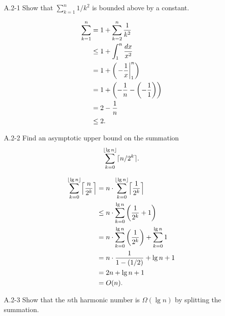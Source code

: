 \begin{enumerate}

\item[A.2{-}1] {Show that $\sum_{k = 1}^{n} 1/k^2$ is bounded above by
a constant.}

\begin{framed}
\begin{equation*}
\begin{aligned}
  \sum_{k = 1}^{n} &=   1 + \sum_{k = 2}^{n} \frac{1}{k^2}\\
                   &\le 1 + \int_{1}^{n} \frac{dx}{x^2}\\
                   &=   1 + \left( \left.- \frac{1}{x}\right\rvert_{1}^{n} \right)\\
                   &=   1 + \left( - \frac{1}{n} - \left( - \frac{1}{1} \right) \right)\\
                   &= 2 - \frac{1}{n}\\
                   &\le 2.
\end{aligned}
\end{equation*}
\end{framed}

\item[A.2{-}2] {Find an asymptotic upper bound on the summation
\[
  \sum_{k = 0}^{\lfloor\lg n\rfloor} \lceil n/2^k\rceil.
\]
}

\begin{framed}
\begin{equation*}
\begin{aligned}
  \sum_{k = 0}^{\lfloor\lg n\rfloor} \Bigl\lceil \frac{n}{2^k} \Bigr\rceil
  &=   n \cdot \sum_{k = 0}^{\lfloor\lg n\rfloor}  \Bigl\lceil \frac{1}{2^k} \Bigr\rceil\\
  &\le n \cdot \sum_{k = 0}^{\lg n}  \left( \frac{1}{2^k} + 1 \right)\\
  &=   n \cdot \sum_{k = 0}^{\lg n}  \left( \frac{1}{2^k} \right) + \sum_{k = 0}^{\lg n} 1\\
  &=   n \cdot \frac{1}{1 - (1/2)} + \lg n + 1\\
  &=   2n + \lg n + 1\\
  &=   O(n).
\end{aligned}
\end{equation*}
\end{framed}

\item[A.2{-}3] {Show that the $n$th harmonic number is $\Omega(\lg n)$ by
splitting the summation.}


\end{enumerate}
